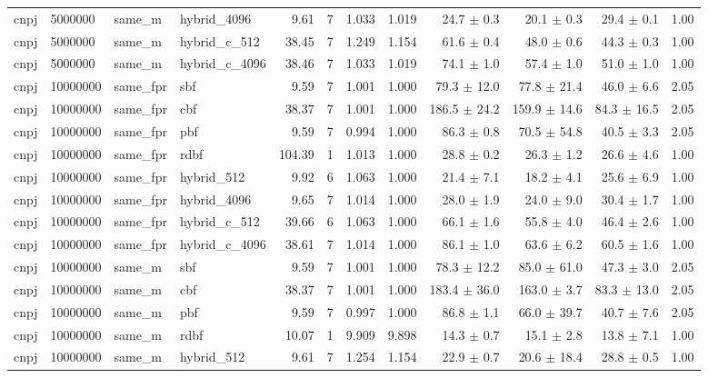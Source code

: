 \begin{tabular}{llllrrrrrrrr}
cnpj & 5000000 & same\_m & hybrid\_4096 & 9.61 & 7 & 1.033 & 1.019 & 24.7 $\pm$ 0.3 & 20.1 $\pm$ 0.3 & 29.4 $\pm$ 0.1 & 1.00 \\
cnpj & 5000000 & same\_m & hybrid\_c\_512 & 38.45 & 7 & 1.249 & 1.154 & 61.6 $\pm$ 0.4 & 48.0 $\pm$ 0.6 & 44.3 $\pm$ 0.3 & 1.00 \\
cnpj & 5000000 & same\_m & hybrid\_c\_4096 & 38.46 & 7 & 1.033 & 1.019 & 74.1 $\pm$ 1.0 & 57.4 $\pm$ 1.0 & 51.0 $\pm$ 1.0 & 1.00 \\
cnpj & 10000000 & same\_fpr & sbf & 9.59 & 7 & 1.001 & 1.000 & 79.3 $\pm$ 12.0 & 77.8 $\pm$ 21.4 & 46.0 $\pm$ 6.6 & 2.05 \\
cnpj & 10000000 & same\_fpr & cbf & 38.37 & 7 & 1.001 & 1.000 & 186.5 $\pm$ 24.2 & 159.9 $\pm$ 14.6 & 84.3 $\pm$ 16.5 & 2.05 \\
cnpj & 10000000 & same\_fpr & pbf & 9.59 & 7 & 0.994 & 1.000 & 86.3 $\pm$ 0.8 & 70.5 $\pm$ 54.8 & 40.5 $\pm$ 3.3 & 2.05 \\
cnpj & 10000000 & same\_fpr & rdbf & 104.39 & 1 & 1.013 & 1.000 & 28.8 $\pm$ 0.2 & 26.3 $\pm$ 1.2 & 26.6 $\pm$ 4.6 & 1.00 \\
cnpj & 10000000 & same\_fpr & hybrid\_512 & 9.92 & 6 & 1.063 & 1.000 & 21.4 $\pm$ 7.1 & 18.2 $\pm$ 4.1 & 25.6 $\pm$ 6.9 & 1.00 \\
cnpj & 10000000 & same\_fpr & hybrid\_4096 & 9.65 & 7 & 1.014 & 1.000 & 28.0 $\pm$ 1.9 & 24.0 $\pm$ 9.0 & 30.4 $\pm$ 1.7 & 1.00 \\
cnpj & 10000000 & same\_fpr & hybrid\_c\_512 & 39.66 & 6 & 1.063 & 1.000 & 66.1 $\pm$ 1.6 & 55.8 $\pm$ 4.0 & 46.4 $\pm$ 2.6 & 1.00 \\
cnpj & 10000000 & same\_fpr & hybrid\_c\_4096 & 38.61 & 7 & 1.014 & 1.000 & 86.1 $\pm$ 1.0 & 63.6 $\pm$ 6.2 & 60.5 $\pm$ 1.6 & 1.00 \\
cnpj & 10000000 & same\_m & sbf & 9.59 & 7 & 1.001 & 1.000 & 78.3 $\pm$ 12.2 & 85.0 $\pm$ 61.0 & 47.3 $\pm$ 3.0 & 2.05 \\
cnpj & 10000000 & same\_m & cbf & 38.37 & 7 & 1.001 & 1.000 & 183.4 $\pm$ 36.0 & 163.0 $\pm$ 3.7 & 83.3 $\pm$ 13.0 & 2.05 \\
cnpj & 10000000 & same\_m & pbf & 9.59 & 7 & 0.997 & 1.000 & 86.8 $\pm$ 1.1 & 66.0 $\pm$ 39.7 & 40.7 $\pm$ 7.6 & 2.05 \\
cnpj & 10000000 & same\_m & rdbf & 10.07 & 1 & 9.909 & 9.898 & 14.3 $\pm$ 0.7 & 15.1 $\pm$ 2.8 & 13.8 $\pm$ 7.1 & 1.00 \\
cnpj & 10000000 & same\_m & hybrid\_512 & 9.61 & 7 & 1.254 & 1.154 & 22.9 $\pm$ 0.7 & 20.6 $\pm$ 18.4 & 28.8 $\pm$ 0.5 & 1.00 \\

\end{tabular}
